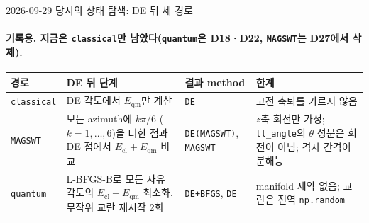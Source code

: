 \begin{frame}[label=state-search-current]{2026-09-29 당시의 상태 탐색: DE 뒤 세 경로}
  \framesubtitle{기록용. 지금은 \texttt{classical}만 남았다(\texttt{quantum}은 D18·D22, \texttt{MAGSWT}는 D27에서 삭제).}
  \small
  \begin{tabularx}{\textwidth}{@{}p{1.7cm}YP{2.2cm}Y@{}}
    \toprule
    경로 & DE 뒤 단계 & 결과 method & 한계 \\
    \midrule
    \texttt{classical} & DE 각도에서 $E_{\mathrm{qm}}$만 계산 & \texttt{DE}
      & 고전 축퇴를 가르지 않음 \\
    \texttt{MAGSWT} & 모든 azimuth에 $k\pi/6$ ($k=1,\dots,6$)을 더한 점과 DE 점에서 $E_{\mathrm{cl}}+E_{\mathrm{qm}}$ 비교
      & \texttt{DE(MAGSWT)}, \texttt{MAGSWT}
      & $z$축 회전만 가정; \texttt{tl\_angle}의 $\theta$ 성분은 회전이 아님; 격자 간격이 분해능 \\
    \texttt{quantum} & L-BFGS-B로 모든 자유 각도의 $E_{\mathrm{cl}}+E_{\mathrm{qm}}$ 최소화, 무작위 교란 재시작 2회
      & \texttt{DE+BFGS}, \texttt{DE}
      & manifold 제약 없음; 교란은 전역 \texttt{np.random} \\
    \bottomrule
  \end{tabularx}
  \par\medskip
\end{frame}


